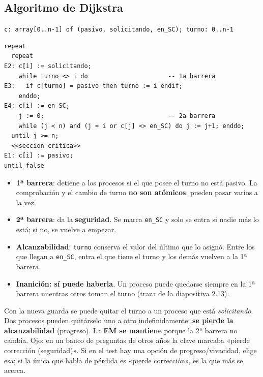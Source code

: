 \documentclass[11pt,a4paper,oneside]{report}
\begin{document}
\subsection{Algoritmo de Dijkstra}
\texttt{c: array[0..n-1] of (pasivo, solicitando, en\_SC); turno: 0..n-1}
\begin{lstlisting}
repeat
  repeat
E2: c[i] := solicitando;
    while turno <> i do                      -- 1a barrera
E3:   if c[turno] = pasivo then turno := i endif;
    enddo;
E4: c[i] := en_SC;
    j := 0;                                  -- 2a barrera
    while (j < n) and (j = i or c[j] <> en_SC) do j := j+1; enddo;
  until j >= n;
  <<seccion critica>>
E1: c[i] := pasivo;
until false
\end{lstlisting}
\begin{itemize}[leftmargin=*]
  \item \textbf{1ª barrera}: detiene a los procesos si el que posee el turno no está pasivo. La comprobación y el
        cambio de turno \textbf{no son atómicos}: pueden pasar varios a la vez.
  \item \textbf{2ª barrera}: da la \textbf{seguridad}. Se marca \texttt{en\_SC} y solo se entra si nadie más lo
        está; si no, se vuelve a empezar.
  \item \textbf{Alcanzabilidad}: \texttt{turno} conserva el valor del último que lo asignó. Entre los que llegan a
        \texttt{en\_SC}, entra el que tiene el turno y los demás vuelven a la 1ª barrera.
  \item \textbf{Inanición: sí puede haberla}. Un proceso puede quedarse siempre en la 1ª barrera mientras otros
        toman el turno (traza de la diapositiva 2.13).
\end{itemize}

\begin{aviso}
Con la nueva guarda se puede quitar el turno a un proceso que está \emph{solicitando}. Dos procesos pueden
quitárselo uno a otro indefinidamente: \textbf{se pierde la alcanzabilidad} (progreso). La \textbf{EM se mantiene}
porque la 2ª barrera no cambia. Ojo: en un banco de preguntas de otros años la clave marcaba «pierde corrección
(seguridad)». Si en el test hay una opción de progreso/vivacidad, elige esa; si la única que habla de pérdida
es «pierde corrección», es la que más se acerca.
\end{aviso}
\end{document}
